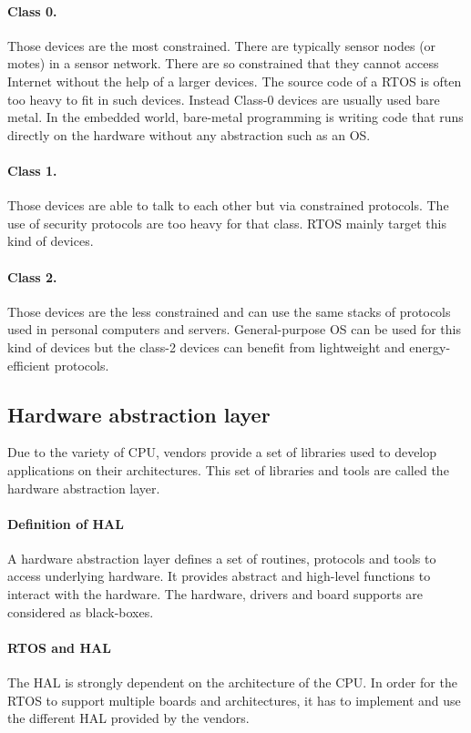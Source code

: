 \paragraph{Class 0.}
Those devices are the most constrained.
There are typically sensor nodes (or motes) in a sensor network.
There are so constrained that they cannot access Internet without the help of a larger devices.
The source code of a RTOS is often too heavy to fit in such devices.
Instead Class-0 devices are usually used bare metal.
In the embedded world, bare-metal programming is writing code that runs directly on the hardware without any abstraction such as an OS.

\paragraph{Class 1.}
Those devices are able to talk to each other but via constrained protocols.
The use of security protocols are too heavy for that class.
RTOS mainly target this kind of devices.

\paragraph{Class 2.}
Those devices are the less constrained and can use the same stacks of protocols used in personal computers and servers.
General-purpose OS can be used for this kind of devices but the class-2 devices can benefit from lightweight and energy-efficient protocols.

\subsection{Hardware abstraction layer}

Due to the variety of CPU, vendors provide a set of libraries used to develop applications on their architectures.
This set of libraries and tools are called the hardware abstraction layer.

\paragraph{Definition of HAL}
A hardware abstraction layer defines a set of routines, protocols and tools to access underlying hardware.
It provides abstract and high-level functions to interact with the hardware.
The hardware, drivers and board supports are considered as black-boxes.

\paragraph{RTOS and HAL}
The HAL is strongly dependent on the architecture of the CPU.
In order for the RTOS to support multiple boards and architectures, it has to implement and use the different HAL provided by the vendors.

